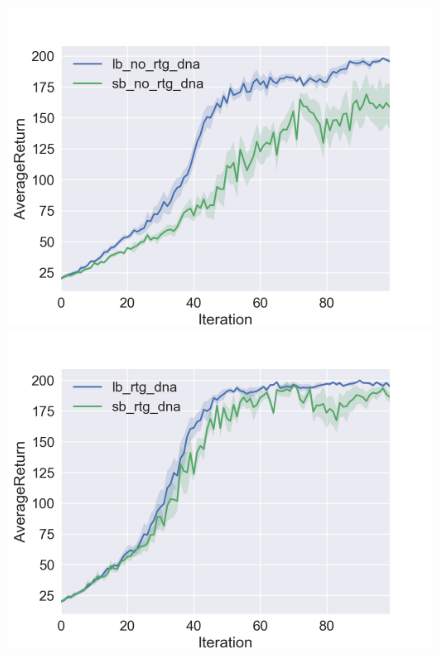 \documentclass[a4paper]{article}
\theoremstyle{definition}
\begin{document}
\begin{figure}[H]
\centering
\begin{minipage}{.3\textwidth}
  \centering
  \includegraphics[width=\linewidth]{figures/4_2_1_no_rtg_dna.png}
\end{minipage}%
\hfill
\begin{minipage}{.3\textwidth}
  \centering
\includegraphics[width=\linewidth]{figures/4_2_1_rtg_dna.png}
\end{minipage}
\hfill
\begin{minipage}{.3\textwidth}
  \centering

\end{minipage}
\end{figure}
\end{document}

